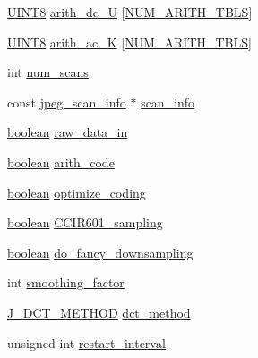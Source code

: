 \begin{DoxyCompactItemize}
\item 
\hyperlink{jmorecfg_8h_adfb9a8ea1dd59f151065f763e1e9acd6}{U\+I\+N\+T8} \hyperlink{structjpeg__compress__struct_a6ba30334643b7a5280343fe0e5e49e1e}{arith\+\_\+dc\+\_\+\+U} \mbox{[}\hyperlink{jpeglib_8h_a4efb0fccc8d9db72ca18f32a26fad6ab}{N\+U\+M\+\_\+\+A\+R\+I\+T\+H\+\_\+\+T\+B\+L\+S}\mbox{]}
\item 
\hyperlink{jmorecfg_8h_adfb9a8ea1dd59f151065f763e1e9acd6}{U\+I\+N\+T8} \hyperlink{structjpeg__compress__struct_ac1994386d3fa3ff139b63bf4bb4dcc36}{arith\+\_\+ac\+\_\+\+K} \mbox{[}\hyperlink{jpeglib_8h_a4efb0fccc8d9db72ca18f32a26fad6ab}{N\+U\+M\+\_\+\+A\+R\+I\+T\+H\+\_\+\+T\+B\+L\+S}\mbox{]}
\item 
int \hyperlink{structjpeg__compress__struct_abf2f96c340659a09a9ce08469a17e08b}{num\+\_\+scans}
\item 
const \hyperlink{structjpeg__scan__info}{jpeg\+\_\+scan\+\_\+info} $\ast$ \hyperlink{structjpeg__compress__struct_a545fed3fef0d0c5962dbe0e80c067c03}{scan\+\_\+info}
\item 
\hyperlink{jmorecfg_8h_a7c6368b321bd9acd0149b030bb8275ed}{boolean} \hyperlink{structjpeg__compress__struct_a7f9dfd37243943bc138815bcf1e89584}{raw\+\_\+data\+\_\+in}
\item 
\hyperlink{jmorecfg_8h_a7c6368b321bd9acd0149b030bb8275ed}{boolean} \hyperlink{structjpeg__compress__struct_a93a42fe4e984ab0afff45636e23d538a}{arith\+\_\+code}
\item 
\hyperlink{jmorecfg_8h_a7c6368b321bd9acd0149b030bb8275ed}{boolean} \hyperlink{structjpeg__compress__struct_a2ed9c1e2bd808fd684338a009a164ef3}{optimize\+\_\+coding}
\item 
\hyperlink{jmorecfg_8h_a7c6368b321bd9acd0149b030bb8275ed}{boolean} \hyperlink{structjpeg__compress__struct_abf474ed47e9f0a9c066bc47de5b0e8e7}{C\+C\+I\+R601\+\_\+sampling}
\item 
\hyperlink{jmorecfg_8h_a7c6368b321bd9acd0149b030bb8275ed}{boolean} \hyperlink{structjpeg__compress__struct_a683db079af3beb44eaab5b421a5a9d4f}{do\+\_\+fancy\+\_\+downsampling}
\item 
int \hyperlink{structjpeg__compress__struct_a0e14f65876566ff8eec195d124535307}{smoothing\+\_\+factor}
\item 
\hyperlink{jpeglib_8h_ae4245c819e9217a321fb23f1a106d563}{J\+\_\+\+D\+C\+T\+\_\+\+M\+E\+T\+H\+O\+D} \hyperlink{structjpeg__compress__struct_ab782f698c650e8ec5f9b47043691d3c1}{dct\+\_\+method}
\item 
unsigned int \hyperlink{structjpeg__compress__struct_a57ad1f6d9015e25fe272c645dcc3f71e}{restart\+\_\+interval}

\end{DoxyCompactItemize}

